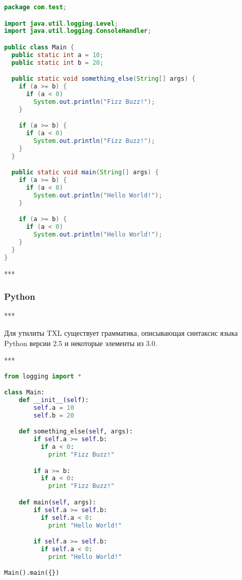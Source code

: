 \begin{lstlisting}[frame=single, language=Java, label={test-java}, caption={Исходный текст тестового приложения}]
package com.test;

import java.util.logging.Level;
import java.util.logging.ConsoleHandler;

public class Main {
  public static int a = 10;
  public static int b = 20;

  public static void something_else(String[] args) {
    if (a >= b) {
      if (a < 0)
        System.out.println("Fizz Buzz!");
    }

    if (a >= b) {
      if (a < 0)
        System.out.println("Fizz Buzz!");
    }
  }

  public static void main(String[] args) {
    if (a >= b) {
      if (a < 0)
        System.out.println("Hello World!");
    }

    if (a >= b) {
      if (a < 0)
        System.out.println("Hello World!");
    }
  }
}
\end{lstlisting}

***

\subsubsection{Python}

***

Для утилиты TXL существует грамматика, описывающая синтаксис языка Python версии 2.5 и некоторые элементы из 3.0.

***

\begin{lstlisting}[frame=single, language=Python, label={test-python}, caption={Исходный текст тестового приложения}]
from logging import *

class Main:
    def __init__(self):
        self.a = 10
        self.b = 20

    def something_else(self, args):
        if self.a >= self.b:
          if a < 0:
            print "Fizz Buzz!"

        if a >= b:
          if a < 0:
            print "Fizz Buzz!"

    def main(self, args):
        if self.a >= self.b:
          if self.a < 0:
            print "Hello World!"

        if self.a >= self.b:
          if self.a < 0:
            print "Hello World!"

Main().main({})
\end{lstlisting}

